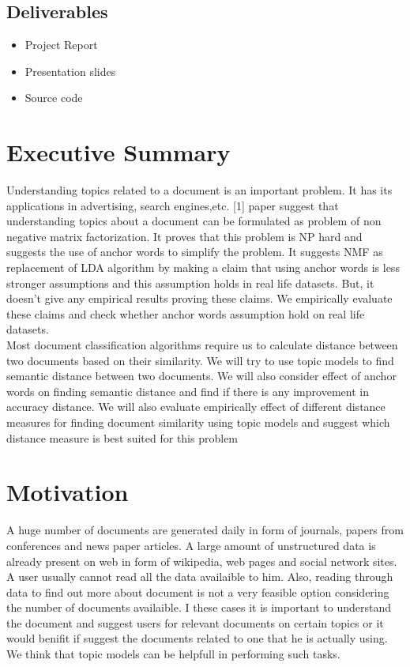 \documentclass[a4paper,11pt]{article}
\begin{document}
\subsection{Deliverables}
\begin{itemize}
\item Project Report
\item Presentation slides
\item Source code
\end{itemize}


\section{Executive Summary}
Understanding topics related to a document is an important problem. It has its applications in advertising, search engines,etc. [1] paper suggest that understanding topics about a document can be formulated as problem of non negative matrix factorization. It proves that this problem is NP hard and suggests the use of anchor words to simplify the problem. It suggests NMF as replacement of LDA algorithm by making a claim that using anchor words is less stronger assumptions and this assumption holds in real life datasets. But, it doesn't give any empirical results proving these claims. We empirically evaluate these claims and check whether anchor words assumption hold on real life datasets.\\
Most document classification algorithms require us to calculate distance between two documents based on their similarity. We will try to use topic models to find semantic distance between two documents. We will also consider effect of anchor words on finding semantic distance and find if there is any improvement in accuracy distance. We will also evaluate empirically effect of different distance measures for finding document similarity using topic models and suggest which distance measure is best suited for this problem


\section{Motivation}


A huge number of documents are generated daily in form of journals, papers from conferences and  news paper articles. A large amount of unstructured data is already present on web in form of wikipedia, web pages and social network sites. A user usually cannot read all the data availaible to him. Also, reading through data to find out more about document is not a very feasible option considering the number of documents availaible. I these cases it is important to understand the document and suggest users for relevant documents on certain topics or it would benifit if suggest the documents related to one that he is actually using. We think that topic models can be helpfull in performing such tasks. \\
\end{document}

